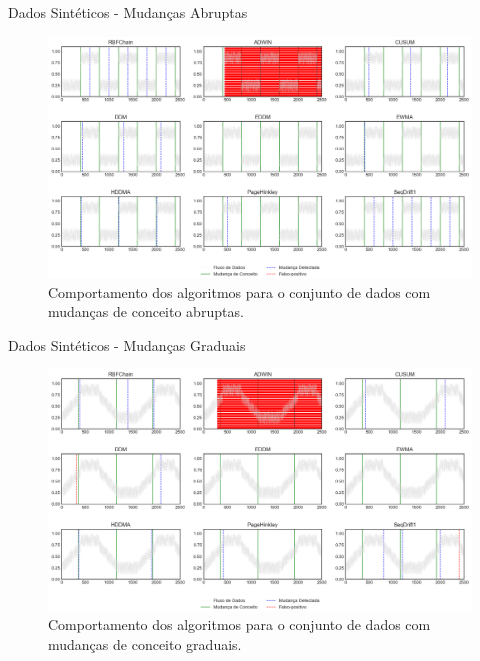 \documentclass[10pt]{beamer}
\begin{document}
\begin{frame}{Dados Sintéticos -  Mudanças Abruptas}
    \begin{figure}[t]
        \begin{center}
            \includegraphics[width=\textwidth]{imagens/abrupt.png}
            \caption{Comportamento dos algoritmos para o conjunto de dados com mudanças de conceito abruptas.}
            \label{fig:exp_abrupta}
        \end{center}
    \end{figure}
\end{frame}

\begin{frame}{Dados Sintéticos -  Mudanças Graduais}
    \begin{figure}[t]
        \begin{center}
            \includegraphics[width=\textwidth]{imagens/gradual.png}
            \caption{Comportamento dos algoritmos para o conjunto de dados com mudanças de conceito graduais.}
            \label{fig:exp_gradual}
        \end{center}
    \end{figure}
\end{frame}
\end{document}
